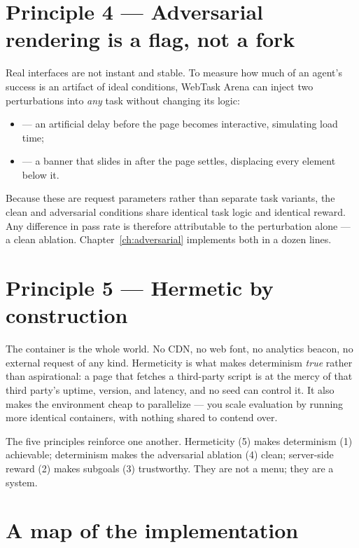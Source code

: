 \documentclass[11pt,openany]{book}
\newcommand{\code}[1]{\textcolor{clayd}{\texttt{\detokenize{#1}}}}
\begin{document}
\section{Principle 4 — Adversarial rendering is a flag, not a fork}

Real interfaces are not instant and stable. To measure how much of an agent's
success is an artifact of ideal conditions, WebTask Arena can inject two
perturbations into \emph{any} task without changing its logic:

\begin{itemize}[leftmargin=1.4em,itemsep=2pt]
\item \code{latency_ms} — an artificial delay before the page becomes interactive,
simulating load time;
\item \code{layout_shift} — a banner that slides in after the page settles,
displacing every element below it.
\end{itemize}

Because these are request parameters rather than separate task variants, the
clean and adversarial conditions share identical task logic and identical
reward. Any difference in pass rate is therefore attributable to the perturbation
alone — a clean ablation. Chapter~\ref{ch:adversarial} implements both in a
dozen lines.

\section{Principle 5 — Hermetic by construction}

The container is the whole world. No CDN, no web font, no analytics beacon, no
external request of any kind. Hermeticity is what makes determinism \emph{true}
rather than aspirational: a page that fetches a third-party script is at the mercy
of that third party's uptime, version, and latency, and no seed can control it.
It also makes the environment cheap to parallelize — you scale evaluation by
running more identical containers, with nothing shared to contend over.

\begin{notebox}[.\ ]
The five principles reinforce one another. Hermeticity (5) makes determinism (1)
achievable; determinism makes the adversarial ablation (4) clean; server-side
reward (2) makes subgoals (3) trustworthy. They are not a menu; they are a
system.
\end{notebox}

\section{A map of the implementation}
\end{document}

